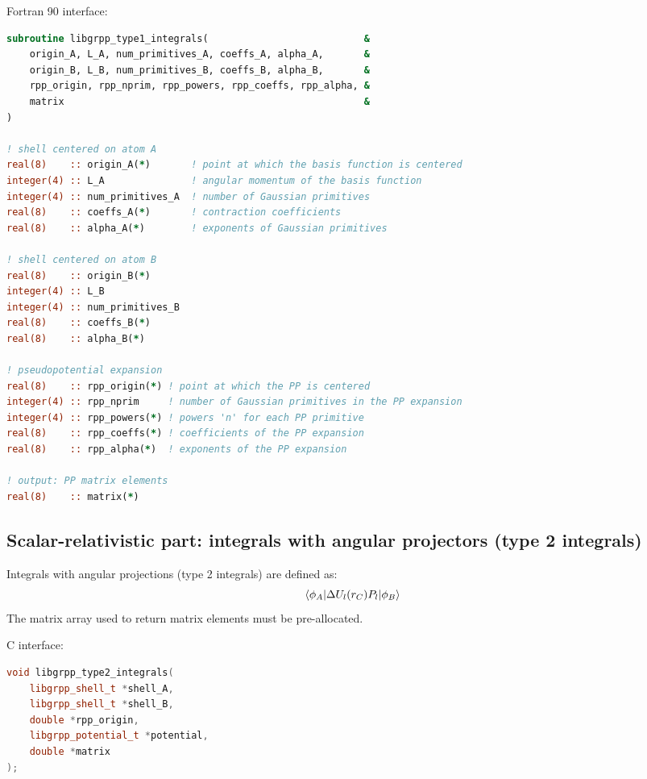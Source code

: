 \documentclass[12pt]{article}
\begin{document}
Fortran 90 interface:
%
\begin{lstlisting}[language=Fortran]
subroutine libgrpp_type1_integrals(                           &
    origin_A, L_A, num_primitives_A, coeffs_A, alpha_A,       &
    origin_B, L_B, num_primitives_B, coeffs_B, alpha_B,       &
    rpp_origin, rpp_nprim, rpp_powers, rpp_coeffs, rpp_alpha, &
    matrix                                                    & 
)

! shell centered on atom A
real(8)    :: origin_A(*)       ! point at which the basis function is centered
integer(4) :: L_A               ! angular momentum of the basis function
integer(4) :: num_primitives_A  ! number of Gaussian primitives
real(8)    :: coeffs_A(*)       ! contraction coefficients
real(8)    :: alpha_A(*)        ! exponents of Gaussian primitives

! shell centered on atom B
real(8)    :: origin_B(*)
integer(4) :: L_B
integer(4) :: num_primitives_B
real(8)    :: coeffs_B(*)
real(8)    :: alpha_B(*)

! pseudopotential expansion
real(8)    :: rpp_origin(*) ! point at which the PP is centered
integer(4) :: rpp_nprim     ! number of Gaussian primitives in the PP expansion
integer(4) :: rpp_powers(*) ! powers 'n' for each PP primitive
real(8)    :: rpp_coeffs(*) ! coefficients of the PP expansion
real(8)    :: rpp_alpha(*)  ! exponents of the PP expansion

! output: PP matrix elements
real(8)    :: matrix(*)
\end{lstlisting}
%

\subsection{Scalar-relativistic part: integrals with angular projectors (type 2 integrals)}

Integrals with angular projections (type 2 integrals) are defined as:
%
\begin{equation}
\braket{\phi_A|\Delta U_l(r_C) P_l|\phi_B}
\label{eq:def-type2-ints}
\end{equation}
%
The matrix array used to return matrix elements must be pre-allocated.

C interface:
%
\begin{lstlisting}[language=C++]
void libgrpp_type2_integrals(
    libgrpp_shell_t *shell_A,
    libgrpp_shell_t *shell_B,
    double *rpp_origin,
    libgrpp_potential_t *potential,
    double *matrix
);
\end{lstlisting}
\end{document}
